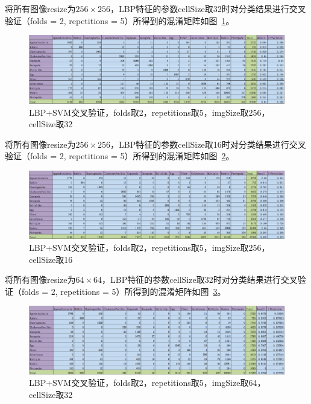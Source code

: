 \documentclass[12pt]{article}
\begin{document}
\begin{enumerate}
将所有图像resize为$256 \times 256$，LBP特征的参数cellSize取32时对分类结果进行交叉验证（folds = 2, repetitions = 5）所得到的混淆矩阵如图~\ref{fig: LBP-SVM-2-folds-5-repetitions-32-256}。
\begin{figure}[!ht]
\centering
\includegraphics[width=1.0\linewidth]{LBP-SVM-2-folds-5-repetitions-32-256}
\caption{LBP+SVM交叉验证，folds取2，repetitions取5，imgSize取256，cellSize取32}
\label{fig: LBP-SVM-2-folds-5-repetitions-32-256}
\end{figure}

将所有图像resize为$256 \times 256$，LBP特征的参数cellSize取16时对分类结果进行交叉验证（folds = 2, repetitions = 5）所得到的混淆矩阵如图~\ref{fig: LBP-SVM-2-folds-5-repetitions-16-256}。
\begin{figure}[!ht]
\centering
\includegraphics[width=1.0\linewidth]{LBP-SVM-2-folds-5-repetitions-16-256}
\caption{LBP+SVM交叉验证，folds取2，repetitions取5，imgSize取256，cellSize取16}
\label{fig: LBP-SVM-2-folds-5-repetitions-16-256}
\end{figure}

将所有图像resize为$64 \times 64$，LBP特征的参数cellSize取32时对分类结果进行交叉验证（folds = 2, repetitions = 5）所得到的混淆矩阵如图~\ref{fig: LBP-SVM-2-folds-5-repetitions-32-64}。
\begin{figure}[!ht]
\centering
\includegraphics[width=1.0\linewidth]{LBP-SVM-2-folds-5-repetitions-32-64}
\caption{LBP+SVM交叉验证，folds取2，repetitions取5，imgSize取64，cellSize取32}
\label{fig: LBP-SVM-2-folds-5-repetitions-32-64}
\end{figure}


\end{enumerate}
\end{document}

